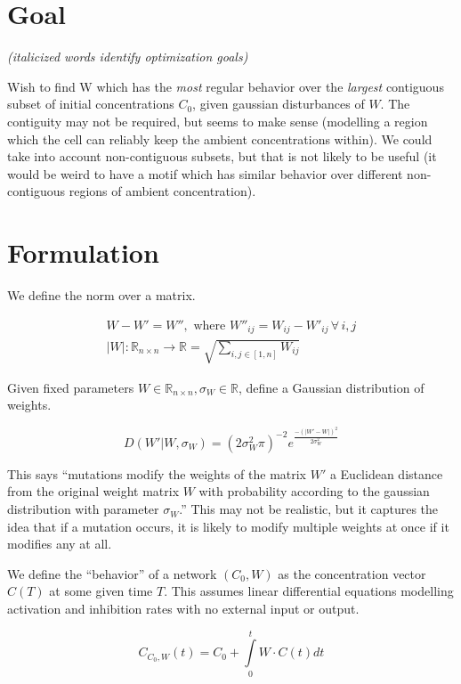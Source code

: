 \documentclass[10pt]{article}
\begin{document}
\section*{Goal}
\textit{(italicized words identify optimization goals)}

Wish to find W which has the \textit{most} regular behavior over the \textit{largest} contiguous subset of initial concentrations $C_0$, given gaussian disturbances of $W$. The contiguity may not be required, but seems to make sense (modelling a region which the cell can reliably keep the ambient concentrations within). We could take into account non-contiguous subsets, but that is not likely to be useful (it would be weird to have a motif which has similar behavior over different non-contiguous regions of ambient concentration).

\section*{Formulation}
We define the norm over a matrix.

\begin{align}
  W - W' = W'',\,\,\text{where}\,\,W''_{ij} = W_{ij} - W'_{ij} \,\forall\, i, j \\
  \lvert W \rvert: \mathbb{R}_{n \times n} \to \mathbb{R} = \sqrt{\sum\limits_{i, j \in [1,n]} W_{ij}}
\end{align}

Given fixed parameters $W \in \mathbb{R}_{n \times n}, \sigma_W \in \mathbb{R}$, define a Gaussian distribution of weights.

\begin{equation}
  D(W'|W,\sigma_W) = (2 \sigma_W^2 \pi)^{-2} e^\frac{-(\lvert W' - W \rvert)^2}{2 \sigma_W^2}
\end{equation}

This says ``mutations modify the weights of the matrix $W'$ a Euclidean distance from the original weight matrix $W$ with probability according to the gaussian distribution with parameter $\sigma_W$.'' This may not be realistic, but it captures the idea that if a mutation occurs, it is likely to modify multiple weights at once if it modifies any at all.

We define the ``behavior'' of a network $(C_0, W)$ as the concentration vector $C(T)$ at some given time $T$. This assumes linear differential equations modelling activation and inhibition rates with no external input or output.

\begin{equation}
  C_{C_0,W}(t) = C_0 + \int\limits_0^t W \cdot C(t) dt
\end{equation}
\end{document}
